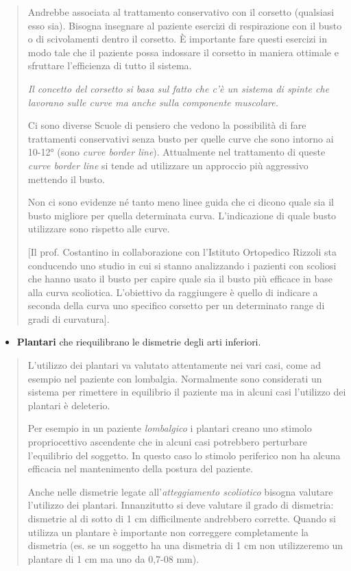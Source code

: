 \documentclass[]{article}
\begin{document}
\begin{quote}
Andrebbe associata al trattamento conservativo con il corsetto
(qualsiasi esso sia). Bisogna insegnare al paziente esercizi di
respirazione con il busto o di scivolamenti dentro il corsetto. È
importante fare questi esercizi in modo tale che il paziente possa
indossare il corsetto in maniera ottimale e sfruttare l'efficienza di
tutto il sistema.

\emph{Il concetto del corsetto si basa sul fatto che c'è un sistema di
spinte che lavorano sulle curve ma anche sulla componente muscolare.}

Ci sono diverse Scuole di pensiero che vedono la possibilità di fare
trattamenti conservativi senza busto per quelle curve che sono intorno
ai 10-12° (sono \emph{curve border line}). Attualmente nel trattamento
di queste \emph{curve border line} si tende ad utilizzare un approccio
più aggressivo mettendo il busto.

Non ci sono evidenze né tanto meno linee guida che ci dicono quale sia
il busto migliore per quella determinata curva. L'indicazione di quale
busto utilizzare sono rispetto alle curve.

{[}Il prof. Costantino in collaborazione con l'Istituto Ortopedico
Rizzoli sta conducendo uno studio in cui si stanno analizzando i
pazienti con scoliosi che hanno usato il busto per capire quale sia il
busto più efficace in base alla curva scoliotica. L'obiettivo da
raggiungere è quello di indicare a seconda della curva uno specifico
corsetto per un determinato range di gradi di curvatura{]}.
\end{quote}

\begin{itemize}
\item
  \textbf{Plantari} che riequilibrano le dismetrie degli arti inferiori.
\end{itemize}

\begin{quote}
L'utilizzo dei plantari va valutato attentamente nei vari casi, come ad
esempio nel paziente con lombalgia. Normalmente sono considerati un
sistema per rimettere in equilibrio il paziente ma in alcuni casi
l'utilizzo dei plantari è deleterio.

Per esempio in un paziente \emph{lombalgico} i plantari creano uno
stimolo propriocettivo ascendente che in alcuni casi potrebbero
perturbare l'equilibrio del soggetto. In questo caso lo stimolo
periferico non ha alcuna efficacia nel mantenimento della postura del
paziente.

Anche nelle dismetrie legate all'\emph{atteggiamento scoliotico} bisogna
valutare l'utilizzo dei plantari. Innanzitutto si deve valutare il grado
di dismetria: dismetrie al di sotto di 1 cm difficilmente andrebbero
corrette. Quando si utilizza un plantare è importante non correggere
completamente la dismetria (es. se un soggetto ha una dismetria di 1 cm
non utilizzeremo un plantare di 1 cm ma uno da 0,7-08 mm).
\end{quote}
\end{document}

